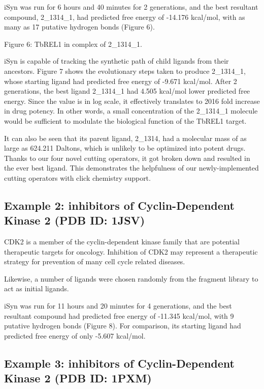 iSyn was run for 6 hours and 40 minutes for 2 generations, and the best resultant compound, 2_1314_1, had predicted free energy of -14.176 kcal/mol, with as many as 17 putative hydrogen bonds (Figure 6).

 
Figure 6: TbREL1 in complex of 2_1314_1.

iSyn is capable of tracking the synthetic path of child ligands from their ancestors. Figure 7 shows the evolutionary steps taken to produce 2_1314_1, whose starting ligand had predicted free energy of -9.671 kcal/mol. After 2 generations, the best ligand 2_1314_1 had 4.505 kcal/mol lower predicted free energy. Since the value is in log scale, it effectively translates to 2016 fold increase in drug potency. In other words, a small concentration of the 2_1314_1 molecule would be sufficient to modulate the biological function of the TbREL1 target.

It can also be seen that its parent ligand, 2_1314, had a molecular mass of as large as 624.211 Daltons, which is unlikely to be optimized into potent drugs. Thanks to our four novel cutting operators, it got broken down and resulted in the ever best ligand. This demonstrates the helpfulness of our newly-implemented cutting operators with click chemistry support.

\subsection{Example 2: inhibitors of Cyclin-Dependent Kinase 2 (PDB ID: 1JSV)}

CDK2 is a member of the cyclin-dependent kinase family that are potential therapeutic targets for oncology. Inhibition of CDK2 may represent a therapeutic strategy for prevention of many cell cycle related diseases.

Likewise, a number of ligands were chosen randomly from the fragment library to act as initial ligands.

iSyn was run for 11 hours and 20 minutes for 4 generations, and the best resultant compound had predicted free energy of -11.345 kcal/mol, with 9 putative hydrogen bonds (Figure 8). For comparison, its starting ligand had predicted free energy of only -5.607 kcal/mol.

\subsection{Example 3: inhibitors of Cyclin-Dependent Kinase 2 (PDB ID: 1PXM)}

